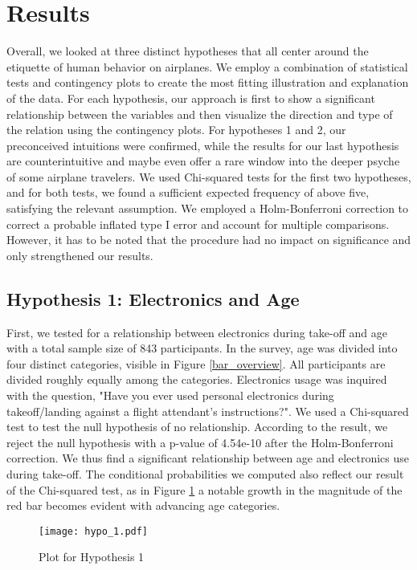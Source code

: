 \documentclass{article}
\theoremstyle{plain}
\theoremstyle{definition}
\theoremstyle{remark}
\begin{document}
\section{Results}\label{sec:results}
Overall, we looked at three distinct hypotheses that all center around the etiquette of human behavior on airplanes. We employ a combination of statistical tests and contingency plots to create the most fitting illustration and explanation of the data. For each hypothesis, our approach is first to show a significant relationship between the variables and then visualize the direction and type of the relation using the contingency plots. For hypotheses 1 and 2, our preconceived intuitions were confirmed, while the results for our last hypothesis are counterintuitive and maybe even offer a rare window into the deeper psyche of some airplane travelers. We used Chi-squared tests for the first two hypotheses, and for both tests, we found a sufficient expected frequency of above five, satisfying the relevant assumption. We employed a Holm-Bonferroni correction to correct a probable inflated type I error \citep{holm-bonferroni} and account for multiple comparisons. However, it has to be noted that the procedure had no impact on significance and only strengthened our results.

\subsection{Hypothesis 1: Electronics and Age}

First, we tested for a relationship between electronics during take-off and age with a total sample size of 843 participants. In the survey, age was divided into four distinct categories, visible in Figure \ref{bar_overview}. All participants are divided roughly equally among the categories. Electronics usage was inquired with the question, "Have you ever used personal electronics during takeoff/landing against a flight attendant's instructions?". We used a Chi-squared test to test the null hypothesis of no relationship. According to the result, we reject the null hypothesis with a p-value of 4.54e-10 after the Holm-Bonferroni correction. We thus find a significant relationship between age and electronics use during take-off. The conditional probabilities we computed also reflect our result of the Chi-squared test, as in Figure \ref{hypothesis1} a notable growth in the magnitude of the red bar becomes evident with advancing age categories.
\begin{figure}[h]
    \texttt{[image: hypo\_1.pdf]}
    \caption{Plot for Hypothesis 1}
    \label{hypothesis1}
\end{figure}
\end{document}
